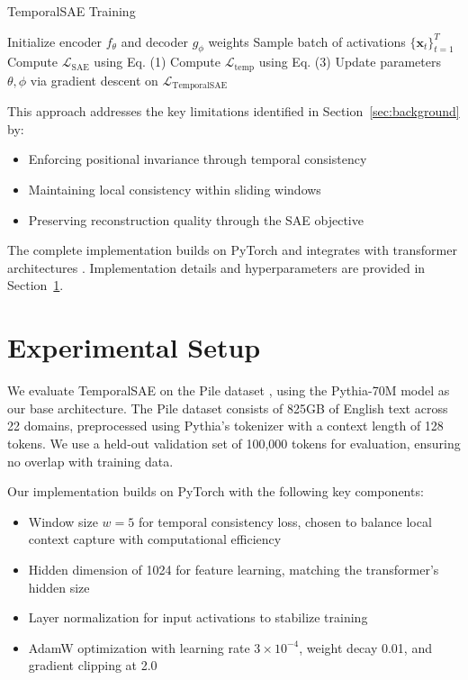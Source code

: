 \documentclass{article} %
\begin{document}
\begin{algorithm}[t]
\caption{TemporalSAE Training}
\label{alg:training}
\begin{algorithmic}[1]
\State Initialize encoder $f_\theta$ and decoder $g_\phi$ weights
    \State Sample batch of activations $\{\mathbf{x}_t\}_{t=1}^T$
    \State Compute $\mathcal{L}_{\text{SAE}}$ using Eq. (1)
    \State Compute $\mathcal{L}_{\text{temp}}$ using Eq. (3)
    \State Update parameters $\theta, \phi$ via gradient descent on $\mathcal{L}_{\text{TemporalSAE}}$
\EndFor
\end{algorithmic}
\end{algorithm}

This approach addresses the key limitations identified in Section~\ref{sec:background} by:
\begin{itemize}
    \item Enforcing positional invariance through temporal consistency
    \item Maintaining local consistency within sliding windows
    \item Preserving reconstruction quality through the SAE objective
\end{itemize}

The complete implementation builds on PyTorch \cite{paszke2019pytorch} and integrates with transformer architectures \cite{vaswani2017attention}. Implementation details and hyperparameters are provided in Section~\ref{sec:experimental}.

\section{Experimental Setup}
\label{sec:experimental}

We evaluate TemporalSAE on the Pile dataset \cite{karpathy2023nanogpt}, using the Pythia-70M model \cite{karpathy2023nanogpt} as our base architecture. The Pile dataset consists of 825GB of English text across 22 domains, preprocessed using Pythia's tokenizer with a context length of 128 tokens. We use a held-out validation set of 100,000 tokens for evaluation, ensuring no overlap with training data.

Our implementation builds on PyTorch \cite{paszke2019pytorch} with the following key components:
\begin{itemize}
    \item Window size $w=5$ for temporal consistency loss, chosen to balance local context capture with computational efficiency
    \item Hidden dimension of 1024 for feature learning, matching the transformer's hidden size
    \item Layer normalization \cite{ba2016layer} for input activations to stabilize training
    \item AdamW optimization \cite{loshchilov2017adamw} with learning rate $3 \times 10^{-4}$, weight decay 0.01, and gradient clipping at 2.0
\end{itemize}
\end{document}
